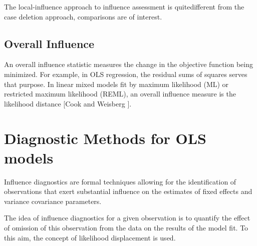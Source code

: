 \documentclass[12pt, a4paper]{article}
\begin{document}
The local-influence approach to influence assessment is quitedifferent from the case deletion approach, comparisons are of
interest.








\subsection{Overall Influence}
An overall influence statistic measures the change in the objective function being minimized. For example, in
OLS regression, the residual sums of squares serves that purpose. In linear mixed models fit by
 maximum likelihood (ML) or  restricted maximum likelihood (REML), an overall influence measure is the  likelihood distance [Cook and Weisberg ].





\section*{Diagnostic Methods for OLS models}
Influence diagnostics are formal techniques allowing for the identification of observations that exert substantial influence on the estimates of fixed effects and variance covariance parameters. 
	
The idea of influence diagnostics for a given observation is to quantify the effect of omission of this observation from the data on the results of the model fit. To this aim, the concept of likelihood displacement is used. 
	
	
\end{document}
